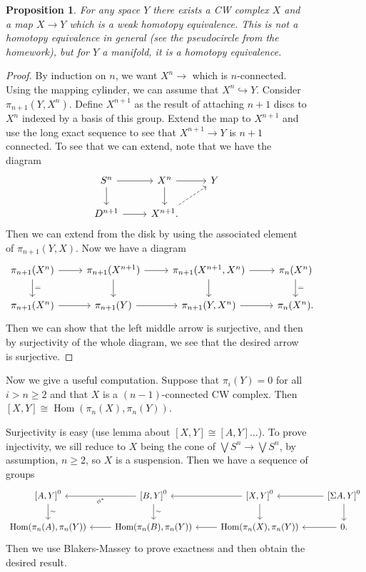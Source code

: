 \documentclass[leqno, openany]{memoir}
\newtheorem{prop}[thm]{Proposition}
\theoremstyle{definition}
\theoremstyle{remark}
\theoremstyle{plain}
\theoremstyle{definition}
\theoremstyle{remark}
\DeclareMathOperator{\Hom}{Hom}
\begin{document}
\begin{figure}[H]
\begin{prop} For any space $Y$ there exists a CW complex $X$ and a map $X \to
    Y$ which is a weak homotopy equivalence. This is not a homotopy equivalence
    in general (see the pseudocircle from the homework), but for $Y$ a
    manifold, it is a homotopy equivalence.  \end{prop}

\begin{proof} By induction on $n$, we want $X^n \to $ which is $n$-connected.
    Using the mapping cylinder, we can assume that $X^n \hookrightarrow Y$.
    Consider $\pi_{n+1}(Y, X^n)$. Define $X^{n+1}$ as the result of attaching
    $n+1$ discs to $X^n$ indexed by a basis of this group. Extend the map to
    $X^{n+1}$ and use the long exact sequence to see that $X^{n+1} \to Y$ is
    $n+1$ connected. To see that we can extend, note that we have the diagram
    \begin{equation*} \begin{tikzcd} S^n \arrow{r} \arrow{d} & X^n \arrow{r}
    \arrow{d} & Y \\ D^{n+1} \arrow{r} & X^{n+1}. \arrow[dashrightarrow]{ur}
\end{tikzcd} \end{equation*} Then we can extend from the disk by using the
        associated element of $\pi_{n+1}(Y,X)$. Now we have a diagram
        \begin{equation*} \begin{tikzcd} \pi_{n+1}(X^n) \arrow{r} \arrow{d}{=}
        & \pi_{n+1}(X^{n+1}) \arrow{d} \arrow{r} & \pi_{n+1}(X^{n+1},X^n)
            \arrow{r} \arrow{d} & \pi_n(X^n) \arrow{d}{=} \\ \pi_{n+1}(X^n)
        \arrow{r} & \pi_{n+1}(Y) \arrow{r} & \pi_{n+1}(Y, X^n) \arrow{r} &
    \pi_n(X^n).  \end{tikzcd} \end{equation*} Then we can show that the left
    middle arrow is surjective, and then by surjectivity of the whole diagram,
    we see that the desired arrow is surjective.  \end{proof}

Now we give a useful computation. Suppose that $\pi_i(Y) = 0$ for all $i > n
\geq 2$ and that $X$ is a $(n-1)$-connected CW complex. Then $[X,Y] \cong
\Hom(\pi_n(X), \pi_n(Y))$.

Surjectivity is easy (use lemma about $[X,Y] \cong [A,Y] \ldots$). To prove
injectivity, we sill reduce to $X$ being the cone of $\bigvee S^n \to \bigvee
S^n$, by assumption, $n \geq 2$, so $X$ is a suspension. Then we have a
sequence of groups \begin{equation*} \begin{tikzcd} { [A,Y] }^0 \arrow{d}{\sim}
& { [B,Y] }^0 \arrow{l}{\phi^*} \arrow{d}{\sim} & { [X,Y] }^0 \arrow{d}
    \arrow{l} & { [\Sigma A, Y] }^0 \arrow{l} \arrow{d} \\ \Hom(\pi_n(A),
    \pi_n(Y)) & \Hom(\pi_n(B), \pi_n(Y)) \arrow{l} & \Hom(\pi_n(X), \pi_n(Y))
    \arrow{l} & 0. \arrow{l} \end{tikzcd} \end{equation*} Then we use
    Blakers-Massey to prove exactness and then obtain the desired result.


\end{figure}
\end{document}
